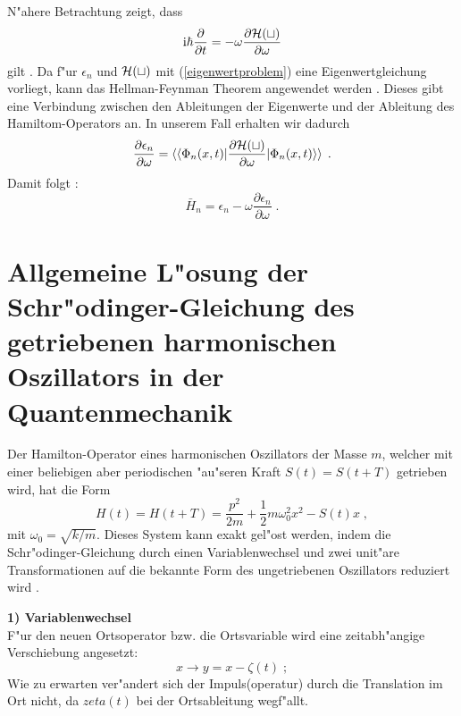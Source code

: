     N"ahere Betrachtung zeigt, dass
    \begin{equation}
      \text{i}\hbar\frac{\partial}{\partial t} = -\omega \frac{\partial \cal{H}(t)}{\partial \omega}
    \end{equation}
    gilt \cite{haenggi}.
    Da f"ur $\epsilon_n$ und $\cal H(t)$ mit (\ref{eigenwertproblem}) eine Eigenwertgleichung vorliegt, kann das Hellman-Feynman Theorem angewendet werden \cite{hellmann online quelle}.
    Dieses gibt eine Verbindung zwischen den Ableitungen der Eigenwerte und der Ableitung des Hamiltom-Operators an.
    In unserem Fall erhalten wir dadurch
    \begin{equation}
      \frac{\partial \epsilon_n}{\partial \omega} = \braket{\braket{\Phi_n(x,t)|\frac{\partial \cal H(t)}{\partial \omega}|\Phi_n(x,t)}} \; .
    \end{equation}
    Damit folgt \cite{haenggi}:
    \begin{equation}
      \bar{H}_n = \epsilon_n - \omega\frac{\partial \epsilon_n}{\partial \omega} \; .
      \label{mittleres_H}
    \end{equation}

  \newpage



  \section{Allgemeine L"osung der Schr"odinger-Gleichung des getriebenen harmonischen Oszillators in der Quantenmechanik}
    \label{lsg_einzelner}
    Der Hamilton-Operator eines harmonischen Oszillators der Masse $m$, welcher mit einer beliebigen aber periodischen "au"seren Kraft $S(t)=S(t+T)$ getrieben wird, hat die Form
    \begin{equation}
      H(t) = H(t+T) = \frac{p^2}{2m} + \frac{1}{2}m\omega_0^2x^2-S(t)x \; ,
    \end{equation}
    mit $\omega_0=\sqrt{k/m}$.
    Dieses System kann exakt gel"ost werden, indem die Schr"odinger-Gleichung durch einen Variablenwechsel und zwei unit"are Transformationen auf die bekannte Form des ungetriebenen Oszillators reduziert wird \cite{haenggi}.

    \textbf{1) Variablenwechsel}\\
    F"ur den neuen Ortsoperator bzw. die Ortsvariable wird eine zeitabh"angige Verschiebung angesetzt:
    \begin{equation}
      x \rightarrow y=x-\zeta(t) \; ;
    \end{equation}
    Wie zu erwarten ver"andert sich der Impuls(operatur) durch die Translation im Ort nicht, da $zeta(t)$ bei der Ortsableitung wegf"allt.

